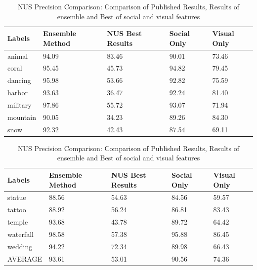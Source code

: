 \begin{table}
\centering
\caption{ NUS Precision Comparison: Comparison of Published Results, Results of ensemble and Best of social and visual features} %
\vspace*{0.2 cm}
\begin{tabular}{| p{1.7cm}| p{1.5cm}|p{1.2cm}|p{1.2cm}|p{1.2cm}|} \hline
Labels & Ensemble Method & NUS Best Results & Social Only & Visual Only  \\  [1ex] \hline
animal & 94.09 & 83.46 & 90.01 & 73.46 \\ [1ex] \hline
coral & 95.45 & 45.73 & 94.82 & 79.45 \\ [1ex] \hline
dancing & 95.98 & 53.66 & 92.82 & 75.59 \\ [1ex] \hline
harbor & 93.63 & 36.47 & 92.24 & 81.40 \\ [1ex] \hline
military & 97.86 & 55.72 & 93.07 & 71.94 \\ [1ex] \hline
mountain & 90.05 & 34.23 & 89.26 & 84.30 \\ [1ex] \hline
snow & 92.32 & 42.43 & 87.54 & 69.11 \\ [1ex] \hline
\end{tabular}
 \hspace{1em}\vspace*{0.5cm}
 \begin{tabular}{| p{1.7cm}| p{1.5cm}|p{1.2cm}|p{1.2cm}|p{1.2cm}|} \hline
Labels & Ensemble Method & NUS Best Results & Social Only & Visual Only  \\  [1ex] \hline
statue & 88.56 & 54.63 & 84.56 & 59.57 \\ [1ex] \hline
tattoo & 88.92 & 56.24 & 86.81 & 83.43 \\ [1ex] \hline
temple & 93.68 & 43.78 & 89.72 & 64.42 \\ [1ex] \hline
waterfall & 98.58 & 57.38 & 95.88 & 86.45 \\ [1ex] \hline
wedding & 94.22 & 72.34 & 89.98 & 66.43 \\ [1ex] \hline
AVERAGE & 93.61 & 53.01 & 90.56 & 74.36 \\ [1ex] \hline
\end{tabular}
 \label{NUSPrecisionOverAll} %
\end{table}


